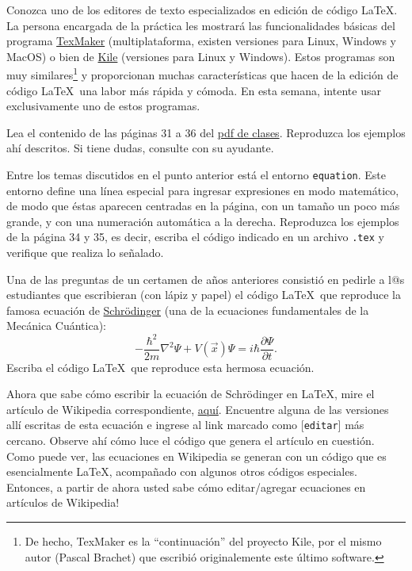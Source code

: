 \documentclass[11pt]{exam}
\begin{document}
\begin{questions}
\item Conozca uno de los editores de texto especializados en edición de código \LaTeX. La persona encargada de la práctica les mostrará las funcionalidades básicas del programa \href{http://www.xm1math.net/texmaker/}{TexMaker} (multiplataforma, existen versiones para Linux, Windows y MacOS) o bien de \href{https://kile.sourceforge.io/}{Kile} (versiones para Linux y Windows). Estos programas son muy similares\footnote{De hecho, TexMaker es la ``continuación'' del proyecto Kile, por el mismo autor (Pascal Brachet) que escribió originalemente este último software.} y proporcionan muchas características que hacen de la edición de código \LaTeX\, una labor más rápida y cómoda. En esta semana, intente usar exclusivamente uno de estos programas.

\item Lea el contenido de las páginas 31 a 36 del \href{https://udec.instructure.com/courses/17852/pages/latex-pdf-presentacion?module_item_id=531012}{pdf de clases}. Reproduzca los ejemplos ahí descritos. Si tiene dudas, consulte con su ayudante.

\item Entre los temas discutidos en el punto anterior está el entorno \texttt{equation}. Este entorno define una línea especial para ingresar expresiones en modo matemático, de modo que éstas aparecen centradas en la página, con un tamaño un poco más grande, y con una numeración automática a la derecha. Reproduzca los ejemplos de la página 34 y 35, es decir, escriba el código indicado en un archivo \texttt{.tex} y verifique que realiza lo señalado.

\item Una de las preguntas de un certamen de a\~nos anteriores consistió en pedirle a l@s estudiantes que escribieran (con lápiz y papel) el código \LaTeX\ que reproduce la famosa ecuación de \href{https://es.wikipedia.org/wiki/Erwin_Schr\%C3\%B6dinger}{Schr\"odinger} (una de la ecuaciones fundamentales de la Mecánica Cuántica):
\begin{equation}
-\frac{\hbar^2}{2m}\nabla^2\Psi+V(\vec{x})\Psi=i\hbar\frac{\partial\Psi}{\partial t}.
\end{equation}
Escriba el código \LaTeX\ que reproduce esta hermosa ecuación.

\item Ahora que sabe cómo escribir la ecuación de Schr\"odinger en \LaTeX, mire el artículo de Wikipedia correspondiente, \href{https://es.wikipedia.org/wiki/Ecuaci\%C3\%B3n_de_Schr\%C3\%B6dinger}{aquí}. Encuentre alguna de las versiones allí escritas de esta ecuación e ingrese al link marcado como [\texttt{editar}] más cercano. Observe ahí cómo luce el código que genera el artículo en cuestión. Como puede ver, las ecuaciones en Wikipedia se generan con un código que es esencialmente \LaTeX, acompa\~nado con algunos otros códigos especiales. Entonces, a partir de ahora usted sabe cómo editar/agregar ecuaciones en artículos de Wikipedia!


\end{questions}
\end{document}
